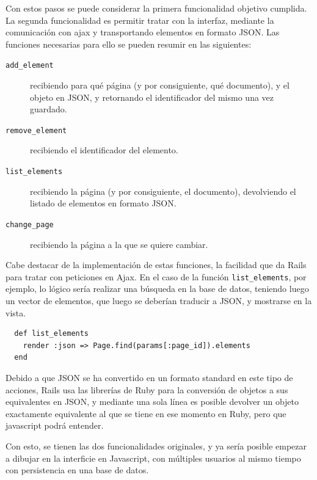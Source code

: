 Con estos pasos se puede considerar la primera funcionalidad objetivo cumplida. La segunda funcionalidad es permitir tratar con la interfaz, mediante la comunicación con ajax y transportando elementos en formato JSON. Las funciones necesarias para ello se pueden resumir en las siguientes:

\begin{description}
  \item[\texttt{add\_element}] recibiendo para qué página (y por consiguiente, qué documento), y el objeto en JSON, y retornando el identificador del mismo una vez guardado.
  \item[\texttt{remove\_element}] recibiendo el identificador del elemento.
  \item[\texttt{list\_elements}] recibiendo la página (y por consiguiente, el documento), devolviendo el listado de elementos en formato JSON.
  \item[\texttt{change\_page}] recibiendo la página a la que se quiere cambiar.
\end{description}

Cabe destacar de la implementación de estas funciones, la facilidad que da Rails para tratar con peticiones en Ajax. En el caso de la función \texttt{list\_elements}, por ejemplo, lo lógico sería realizar una búsqueda en la base de datos, teniendo luego un vector de elementos, que luego se deberían traducir a JSON, y mostrarse en la vista.

\begin{verbatim}
  def list_elements
    render :json => Page.find(params[:page_id]).elements
  end
\end{verbatim}

Debido a que JSON se ha convertido en un formato standard en este tipo de acciones, Rails usa las librerías de Ruby para la conversión de objetos a sus equivalentes en JSON, y mediante una sola línea es posible devolver un objeto exactamente equivalente al que se tiene en ese momento en Ruby, pero que javascript podrá entender.

Con esto, se tienen las dos funcionalidades originales, y ya sería posible empezar a dibujar en la interficie en Javascript, con múltiples usuarios al mismo tiempo con persistencia en una base de datos.



